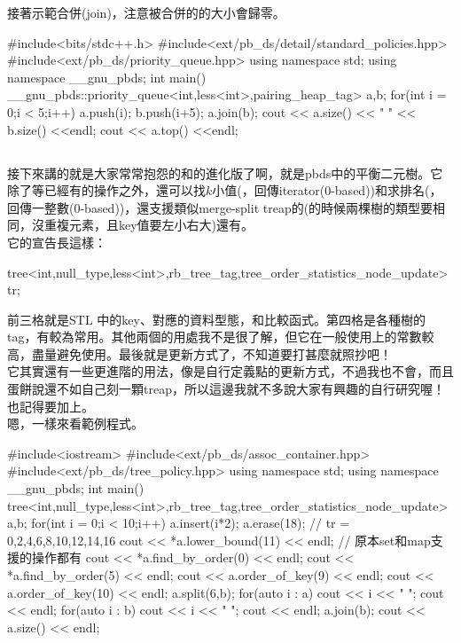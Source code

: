 接著示範合併(join)，注意被合併的的大小會歸零。\\
\begin{C++}
#include<bits/stdc++.h>
#include<ext/pb_ds/detail/standard_policies.hpp>
#include<ext/pb_ds/priority_queue.hpp>
using namespace std;
using namespace __gnu_pbds;
int main()
{
  __gnu_pbds::priority_queue<int,less<int>,pairing_heap_tag> a,b;
  for(int i = 0;i < 5;i++)
  {
    a.push(i);
    b.push(i+5);
  }
  a.join(b);
  cout << a.size() << " " << b.size() <<endl;
  cout << a.top() <<endl;
}

\end{C++}
\subsection{}
接下來講的就是大家常常抱怨的和的進化版了啊，就是pbds中的平衡二元樹。它除了等已經有的操作之外，還可以找$k$小值(，回傳iterator(0-based))和求排名(，回傳一整數(0-based))，還支援類似merge-split treap的(的時候兩棵樹的類型要相同，沒重複元素，且key值要左小右大)還有。\\
它的宣告長這樣：\\
\begin{C++}
tree<int,null_type,less<int>,rb_tree_tag,tree_order_statistics_node_update> tr;
\end{C++}

前三格就是STL 中的key、對應的資料型態，和比較函式。第四格是各種樹的tag，有較為常用。其他兩個的用處我不是很了解，但它在一般使用上的常數較高，盡量避免使用。最後就是更新方式了，不知道要打甚麼就照抄吧！\\
它其實還有一些更進階的用法，像是自行定義點的更新方式，不過我也不會，而且蛋餅說還不如自己刻一顆treap，所以這邊我就不多說大家有興趣的自行研究喔！
也記得要加上。\\
嗯，一樣來看範例程式。\\
\begin{C++}
#include<iostream>
#include<ext/pb_ds/assoc_container.hpp>
#include<ext/pb_ds/tree_policy.hpp>
using namespace std;
using namespace __gnu_pbds;
int main()
{
  tree<int,null_type,less<int>,rb_tree_tag,tree_order_statistics_node_update> a,b;
  for(int i = 0;i < 10;i++)
  {
    a.insert(i*2);
  }
  a.erase(18); // tr = {0,2,4,6,8,10,12,14,16}
  cout << *a.lower_bound(11) << endl; // 原本set和map支援的操作都有
  cout << *a.find_by_order(0) << endl; 
  cout << *a.find_by_order(5) << endl;
  cout << a.order_of_key(9) << endl;
  cout << a.order_of_key(10) << endl;
  a.split(6,b);
  for(auto i : a)
  {
    cout << i << " ";
  }
  cout << endl;
  for(auto i : b)
  {
    cout << i << " ";
  }
  cout << endl;
  a.join(b);
  cout << a.size() << endl;
}
\end{C++}
